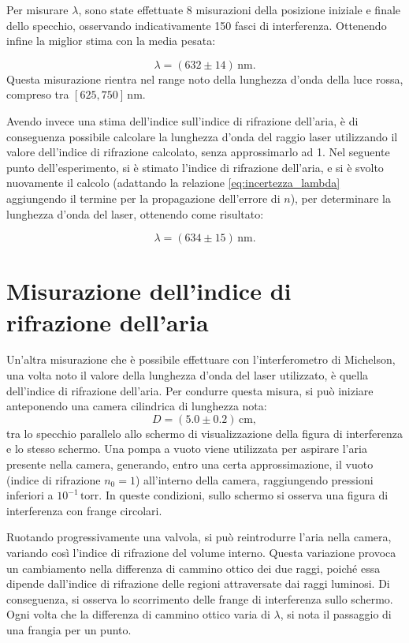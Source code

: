 \documentclass[a4paper,12pt]{article}
\begin{document}
Per misurare \( \lambda \), sono state effettuate 8 misurazioni della posizione iniziale e finale dello specchio, osservando indicativamente 150 fasci di interferenza. 
Ottenendo infine la miglior stima con la media pesata:

\begin{equation}
\lambda = (632 \pm 14) \, \text{nm}.
\label{eq:valore_lambda}
\end{equation}
Questa misurazione rientra nel range noto della lunghezza d’onda della luce rossa, compreso tra \( [625, 750] \, \text{nm} \).

Avendo invece una stima dell’indice sull’indice di rifrazione dell’aria, è di conseguenza possibile calcolare la lunghezza d’onda del raggio laser utilizzando il valore dell’indice di rifrazione calcolato, senza approssimarlo ad 1. 
Nel seguente punto dell’esperimento, si è stimato l’indice di rifrazione dell’aria, e si è svolto nuovamente il calcolo (adattando la relazione \ref{eq:incertezza_lambda} aggiungendo il termine per la propagazione dell'errore di \(n\)), per determinare la lunghezza d’onda del laser, ottenendo come risultato: 

\begin{equation}
    \lambda = (634 \pm 15) \, \text{nm}.
    \label{eq:valore_lambda_2}
    \end{equation}

\section{Misurazione dell’indice di rifrazione dell’aria}

Un’altra misurazione che è possibile effettuare con l’interferometro di Michelson, una volta noto il valore della lunghezza d’onda del laser utilizzato, è quella dell’indice di rifrazione dell’aria.
Per condurre questa misura, si può iniziare anteponendo una camera cilindrica di lunghezza nota:
\[
D = (5.0 \pm 0.2) \, \text{cm},
\]
tra lo specchio parallelo allo schermo di visualizzazione della figura di interferenza e lo stesso schermo. Una pompa a vuoto viene utilizzata per aspirare l’aria presente nella camera, generando, entro una certa approssimazione, il vuoto (indice di rifrazione \(n_0 = 1\)) all’interno della camera, raggiungendo pressioni inferiori a \(10^{-1} \, \text{torr}\). In queste condizioni, sullo schermo si osserva una figura di interferenza con frange circolari.

Ruotando progressivamente una valvola, si può reintrodurre l’aria nella camera, variando così l’indice di rifrazione del volume interno. Questa variazione provoca un cambiamento nella differenza di cammino ottico dei due raggi, poiché essa dipende dall’indice di rifrazione delle regioni attraversate dai raggi luminosi. Di conseguenza, si osserva lo scorrimento delle frange di interferenza sullo schermo. Ogni volta che la differenza di cammino ottico varia di \( \lambda \), si nota il passaggio di una frangia per un punto.
\end{document}

